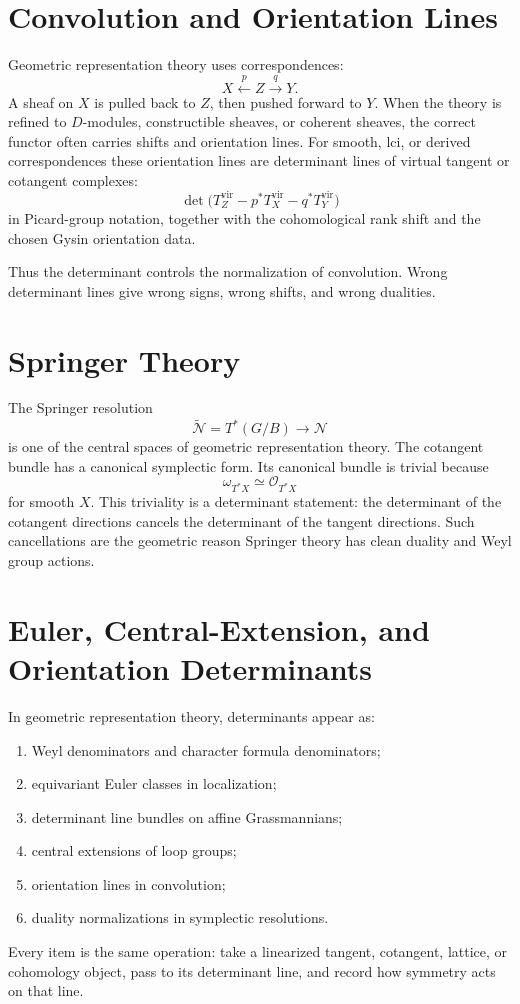 \documentclass[11pt]{memoir}
\providecommand{\cO}{\mathcal{O}}
\begin{document}
\section{Convolution and Orientation Lines}
\label{sec:convolution}

Geometric representation theory uses correspondences:
\[
  X \xleftarrow{p} Z \xrightarrow{q} Y.
\]
A sheaf on \(X\) is pulled back to \(Z\), then pushed forward to \(Y\).
When the theory is refined to \(D\)-modules, constructible sheaves,
or coherent sheaves, the correct functor often carries shifts and
orientation lines. For smooth, lci, or derived correspondences these
orientation lines are determinant lines of virtual tangent or cotangent
complexes:
\[
  \det\bigl(T^{\mathrm{vir}}_Z-p^*T^{\mathrm{vir}}_X
  -q^*T^{\mathrm{vir}}_Y\bigr)
\]
in Picard-group notation, together with the cohomological rank shift
and the chosen Gysin orientation data.

Thus the determinant controls the normalization of convolution. Wrong
determinant lines give wrong signs, wrong shifts, and wrong dualities.

\section{Springer Theory}
\label{sec:springer}

The Springer resolution
\[
  \widetilde{\mathcal N}=T^*(G/B)\to\mathcal N
\]
is one of the central spaces of geometric representation theory. The
cotangent bundle has a canonical symplectic form. Its canonical bundle
is trivial because
\[
  \omega_{T^*X}\simeq \cO_{T^*X}
\]
for smooth \(X\). This triviality is a determinant statement: the
determinant of the cotangent directions cancels the determinant of
the tangent directions. Such cancellations are the geometric reason
Springer theory has clean duality and Weyl group actions.

\section{Euler, Central-Extension, and Orientation Determinants}
\label{sec:grt-lesson}

In geometric representation theory, determinants appear as:
\begin{enumerate}
\item Weyl denominators and character formula denominators;
\item equivariant Euler classes in localization;
\item determinant line bundles on affine Grassmannians;
\item central extensions of loop groups;
\item orientation lines in convolution;
\item duality normalizations in symplectic resolutions.
\end{enumerate}
Every item is the same operation: take a linearized tangent,
cotangent, lattice, or cohomology object, pass to its determinant
line, and record how symmetry acts on that line.
\end{document}
